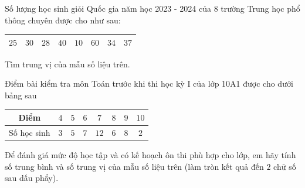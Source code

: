 \begin{bt}[N]%
	Số lượng học sinh giỏi Quốc gia năm học 2023 - 2024 của $8$ trường Trung học phổ thông chuyên được cho như sau:
	\begin{center}
		\begin{tabular}{|l|l|l|l|l|l|l|l|}
		\hline
		  $25$ & $30$ & $28$ & $40$ & $10$ & $60$ & $34$ & $37$ \\
		\hline
	\end{tabular}
	\end{center}	
	Tìm trung vị của mẫu số liệu trên.
	
\end{bt}

\begin{bt}[H]%
	Điểm bài kiểm tra môn Toán trước khi thi học kỳ I của lớp 10A1 được cho dưới bảng sau
	\begin{center}
		\begin{longtable}{|c|c|c|c|c|c|c|c|}
			\hline
			Điểm & $4$ & $5$ & $6$ & $7$ & $8$ & $9$ & $10$\\
			\hline
			Số học sinh & $3$ & $5$ & $7$ & $12$ & $6$ &  $8$ & $2$\\
			\hline
		\end{longtable}
	\end{center}
Để đánh giá mức độ học tập và có kế hoạch ôn thi phù hợp cho lớp, em hãy tính số trung bình và số trung vị của mẫu số liệu trên (làm tròn kết quả đến $2$ chữ số sau dấu phẩy).
\end{bt}


